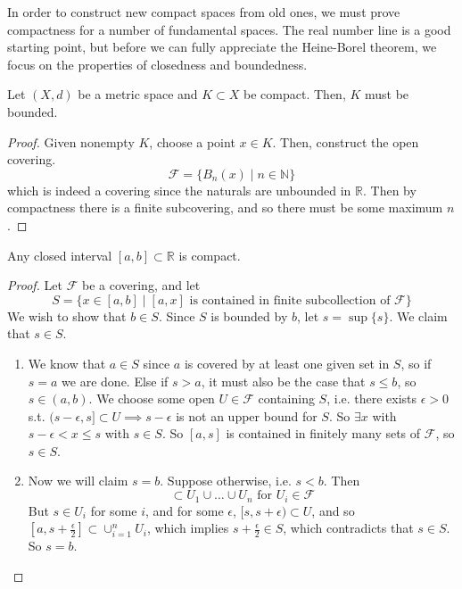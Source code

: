   In order to construct new compact spaces from old ones, we must prove compactness for a number of fundamental spaces. The real number line is a good starting point, but before we can fully appreciate the Heine-Borel theorem, we focus on the properties of closedness and boundedness. 

  \begin{theorem}
    Let $(X, d)$ be a metric space and $K \subset X$ be compact. Then, $K$ must be bounded. 
  \end{theorem} 
  \begin{proof}
    Given nonempty $K$, choose a point $x \in K$. Then, construct the open covering. 
    \begin{equation}
      \mathcal{F} = \{ B_n (x) \mid n \in \mathbb{N} \}
    \end{equation}
    which is indeed a covering since the naturals are unbounded in $\mathbb{R}$. Then by compactness there is a finite subcovering, and so there must be some maximum $n$. 
  \end{proof}

  \begin{lemma}
    Any closed interval $[a, b] \subset \mathbb{R}$ is compact. 
  \end{lemma} 
  \begin{proof}
    Let $\mathcal{F}$ be a covering, and let 
    \begin{equation}
      S = \{x \in [a, b] \mid [a, x] \text{ is contained in finite subcollection of } \mathcal{F} \}
    \end{equation}
    We wish to show that $b \in S$. Since $S$ is bounded by $b$, let $s = \sup\{s\}$. We claim that $s \in S$. 
    \begin{enumerate}
      \item We know that $a \in S$ since $a$ is covered by at least one given set in $S$, so if $s = a$ we are done. Else if $s > a$, it must also be the case that $s \leq b$, so $s \in (a, b)$. We choose some open $U \in \mathcal{F}$ containing $S$, i.e. there exists $\epsilon > 0$ s.t. $(s - \epsilon, s] \subset U \implies s - \epsilon$ is not an upper bound for $S$. So $\exists x$ with $s - \epsilon < x \leq s$ with $s \in S$. So $[a, s]$ is contained in finitely many sets of $\mathcal{F}$, so $s \in S$. 

      \item Now we will claim $s = b$. Suppose otherwise, i.e. $s < b$. Then 
      \begin{equation}
        [a, s] \subset U_1 \cup \ldots \cup U_n \text{ for } U_i \in \mathcal{F}
      \end{equation}
      But $s \in U_i$ for some $i$, and for some $\epsilon$, $[s, s + \epsilon) \subset U$, and so $[a, s + \frac{\epsilon}{2}] \subset \cup_{i=1}^{n} U_i$, which implies $s + \frac{\epsilon}{2} \in S$, which contradicts that $s \in S$. So $s = b$. 
    \end{enumerate}
  \end{proof}

